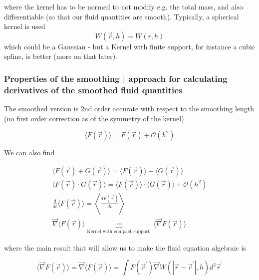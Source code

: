 where the kernel has to be normed to not modify e.g. the total mass, and also differentiable (so that our fluid quantities are smooth). Typically, 
a spherical kernel is used
\begin{equation}
    W(\vec{r},h) = W(r,h)
\end{equation}
which could be a Gaussian - but a Kernel with finite support, for instance
a cubic spline, is better (more on that later).

\subsubsection{Properties of the smoothing | approach for calculating derivatives of the smoothed fluid quantities}
The smoothed version is 2nd order accurate with respect to the smoothing
length (no first order correction as of the symmetry of the kernel)

\begin{equation}
    \langle F(\vec{r})\rangle=F(\vec{r})+\mathcal{O}\left(h^2\right)
\end{equation}

We can also find

\begin{equation}
    \begin{gathered}
        \langle F(\vec{r})+G(\vec{r})\rangle=\langle F(\vec{r})\rangle+\langle G(\vec{r})\rangle \\
        \langle F(\vec{r}) \cdot G(\vec{r})\rangle=\langle F(\vec{r})\rangle \cdot\langle G(\vec{r})\rangle+\mathcal{O}\left(h^2\right) \\
        \boxed{\frac{d}{d t}\langle F(\vec{r})\rangle=\left\langle\frac{d F(\vec{r})}{d t}\right\rangle} \\
        \vec{\nabla}\langle F(\vec{r})\rangle\underbrace{=}_{\text {Kernel with compact support }}\langle\vec{\nabla} F(\vec{r})\rangle
        \end{gathered}
\end{equation}

where the main result that will allow us to make the fluid equation algebraic is

\begin{equation}
    \label{eq:gradient_of_smoothed}
    \boxed{\langle \vec{\nabla} F(\vec{r}) \rangle = \vec{\nabla} \langle F(\vec{r}) \rangle = \int F\left(\vec{r}^{\prime}\right) \vec{\nabla} W\left(\left|\vec{r}-\vec{r}^{\prime}\right|, h\right) d^3 \vec{r}^{\prime}}
\end{equation}

